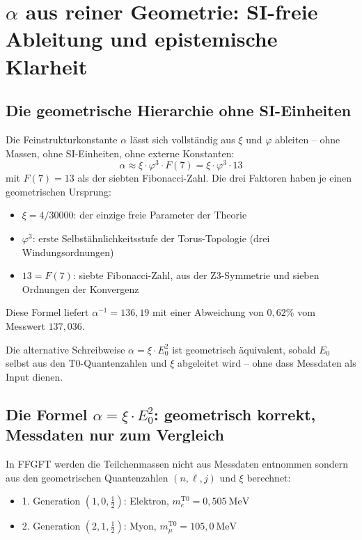 \section{$\alpha$ aus reiner Geometrie: SI-freie Ableitung und epistemische Klarheit}

\subsection{Die geometrische Hierarchie ohne SI-Einheiten}

Die Feinstrukturkonstante $\alpha$ lässt sich vollständig aus $\xi$ und $\varphi$ ableiten -- ohne Massen, ohne SI-Einheiten, ohne externe Konstanten:
\begin{equation}
  \alpha \approx \xi \cdot \varphi^3 \cdot F(7) = \xi \cdot \varphi^3 \cdot 13
\end{equation}
mit $F(7) = 13$ als der siebten Fibonacci-Zahl. Die drei Faktoren haben je einen geometrischen Ursprung:
\begin{itemize}[noitemsep]
  \item $\xi = 4/30000$: der einzige freie Parameter der Theorie
  \item $\varphi^3$: erste Selbstähnlichkeitsstufe der Torus-Topologie (drei Windungsordnungen)
  \item $13 = F(7)$: siebte Fibonacci-Zahl, aus der Z3-Symmetrie und sieben Ordnungen der Konvergenz
\end{itemize}

Diese Formel liefert $\alpha^{-1} = 136{,}19$ mit einer Abweichung von $0{,}62\%$ vom Messwert $137{,}036$.

\medskip
Die alternative Schreibweise $\alpha = \xi \cdot E_0^2$ ist geometrisch äquivalent, sobald $E_0$ selbst aus den T0-Quantenzahlen und $\xi$ abgeleitet wird -- ohne dass Messdaten als Input dienen.

\subsection{Die Formel $\alpha = \xi \cdot E_0^2$: geometrisch korrekt, Messdaten nur zum Vergleich}

In FFGFT werden die Teilchenmassen nicht aus Messdaten entnommen sondern aus den geometrischen Quantenzahlen $(n, \ell, j)$ und $\xi$ berechnet:
\begin{itemize}[noitemsep]
  \item 1. Generation $(1,0,\tfrac{1}{2})$: Elektron, $m_e^{\text{T0}} = 0{,}505\ \text{MeV}$
  \item 2. Generation $(2,1,\tfrac{1}{2})$: Myon, $m_\mu^{\text{T0}} = 105{,}0\ \text{MeV}$
\end{itemize}

